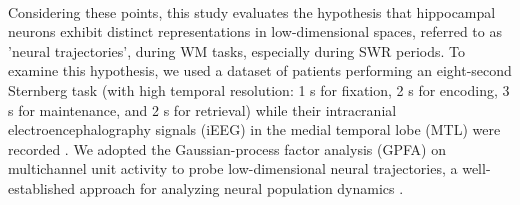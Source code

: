 \\
\indent
Considering these points, this study evaluates the hypothesis that hippocampal neurons exhibit distinct representations in low-dimensional spaces, referred to as 'neural trajectories', during WM tasks, especially during SWR periods. To examine this hypothesis, we used a dataset of patients performing an eight-second Sternberg task (with high temporal resolution: 1 s for fixation, 2 s for encoding, 3 s for maintenance, and 2 s for retrieval) while their intracranial electroencephalography signals (iEEG) in the medial temporal lobe (MTL) were recorded \cite{boran_dataset_2020}. We adopted the Gaussian-process factor analysis (GPFA) on multichannel unit activity to probe low-dimensional neural trajectories, a well-established approach for analyzing neural population dynamics \cite{yu_gaussian-process_2009}.
\label{sec:introduction}